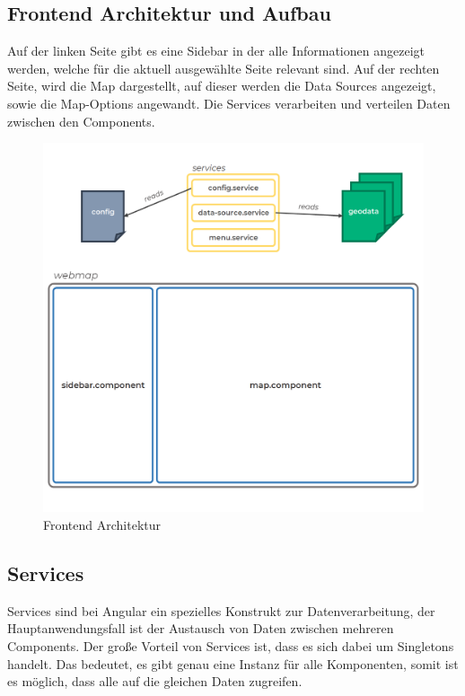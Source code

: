 \subsection{Frontend Architektur und Aufbau}
Auf der linken Seite gibt es eine Sidebar in der alle Informationen angezeigt werden, welche für die aktuell ausgewählte Seite relevant sind.
Auf der rechten Seite, wird die Map dargestellt, auf dieser werden die Data Sources angezeigt, sowie die Map-Options angewandt.
Die Services verarbeiten und verteilen Daten zwischen den Components.

\begin{figure}[hbt!]
    \centering
    \includegraphics[scale=.6]{pics/frontend-architecture}
    \caption{Frontend Architektur}
    \label{fig:frontend-architecture}
\end{figure}

\cleardoublepage

\subsection{Services}
Services sind bei Angular ein spezielles Konstrukt zur Datenverarbeitung, der Hauptanwendungsfall ist der Austausch von Daten
zwischen mehreren Components.
Der große Vorteil von Services ist, dass es sich dabei um Singletons handelt.
Das bedeutet, es gibt genau eine Instanz für alle Komponenten, somit ist es möglich, dass alle auf die gleichen Daten zugreifen.

